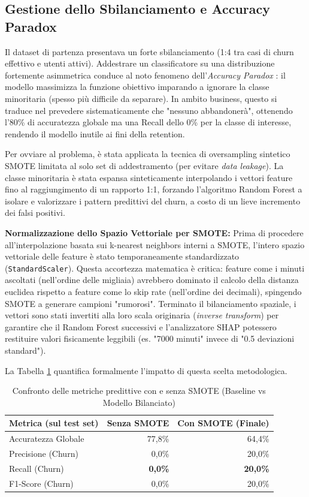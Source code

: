 \documentclass[11pt,a4paper]{article}
\begin{document}
\subsection{Gestione dello Sbilanciamento e Accuracy Paradox}
Il dataset di partenza presentava un forte sbilanciamento (1:4 tra casi di churn effettivo e utenti attivi). Addestrare un classificatore su una distribuzione fortemente asimmetrica conduce al noto fenomeno dell'\textit{Accuracy Paradox} \cite{chawla2002}: il modello massimizza la funzione obiettivo imparando a ignorare la classe minoritaria (spesso più difficile da separare). In ambito business, questo si traduce nel prevedere sistematicamente che "nessuno abbandonerà", ottenendo l'80\% di accuratezza globale ma una Recall dello 0\% per la classe di interesse, rendendo il modello inutile ai fini della retention.

Per ovviare al problema, è stata applicata la tecnica di oversampling sintetico SMOTE limitata al solo set di addestramento (per evitare \textit{data leakage}). La classe minoritaria è stata espansa sinteticamente interpolando i vettori feature fino al raggiungimento di un rapporto 1:1, forzando l'algoritmo Random Forest a isolare e valorizzare i pattern predittivi del churn, a costo di un lieve incremento dei falsi positivi.

\textbf{Normalizzazione dello Spazio Vettoriale per SMOTE:} Prima di procedere all'interpolazione basata sui k-nearest neighbors interni a SMOTE, l'intero spazio vettoriale delle feature è stato temporaneamente standardizzato (\texttt{StandardScaler}). Questa accortezza matematica è critica: feature come i minuti ascoltati (nell'ordine delle migliaia) avrebbero dominato il calcolo della distanza euclidea rispetto a feature come lo skip rate (nell'ordine dei decimali), spingendo SMOTE a generare campioni "rumorosi". Terminato il bilanciamento spaziale, i vettori sono stati invertiti alla loro scala originaria (\textit{inverse transform}) per garantire che il Random Forest successivi e l'analizzatore SHAP potessero restituire valori fisicamente leggibili (es. "7000 minuti" invece di "0.5 deviazioni standard").

La Tabella \ref{tab:oversampling} quantifica formalmente l'impatto di questa scelta metodologica.

\begin{table}[h]
\centering
\caption{Confronto delle metriche predittive con e senza SMOTE (Baseline vs Modello Bilanciato)}
\label{tab:oversampling}
\begin{tabular}{lrr}
\toprule
\textbf{Metrica (sul test set)} & \textbf{Senza SMOTE} & \textbf{Con SMOTE (Finale)} \\
\midrule
Accuratezza Globale & 77,8\% & 64,4\% \\
Precisione (Churn) & 0,0\% & 20,0\% \\
Recall (Churn) & \textbf{0,0\%} & \textbf{20,0\%} \\
F1-Score (Churn) & 0,0\% & 20,0\% \\
\bottomrule
\end{tabular}
\end{table}
\end{document}
